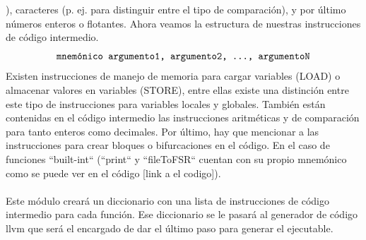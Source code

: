 ), caracteres (p. ej. para distinguir entre el tipo de comparación), y por último números enteros o flotantes. Ahora veamos la estructura de nuestras instrucciones de código intermedio.
\[ 
\texttt{ mnemónico argumento1, argumento2, \dots, argumentoN } 
\]
Existen instrucciones de manejo de memoria para cargar variables (LOAD) o almacenar valores en variables (\textsc{STORE}), entre ellas existe una distinción entre este tipo de instrucciones para variables locales y globales. También están contenidas en el código intermedio las instrucciones aritméticas y de comparación para tanto enteros como decimales. Por último, hay que mencionar a las instrucciones para crear bloques o bifurcaciones en el código. En el caso de funciones ``built-int`` (``print`` y ``fileToFSR`` cuentan con su propio mnemónico como se puede ver en el código [link a el codigo]).\\\\
Este módulo creará un diccionario con una lista de instrucciones de código intermedio para cada función. Ese diccionario se le pasará al generador de código llvm que será el encargado de dar el último paso para generar el ejecutable. 
